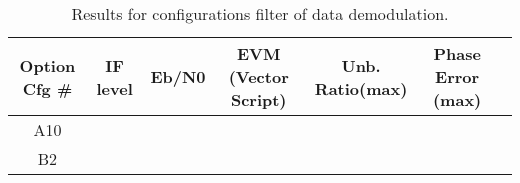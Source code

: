 \begin{table}[H]
	\centering
	\begin{tabular}{|c|c|c|c|c|c|c|}
	\hline	
	Option Cfg \# & IF level & Eb/N0 & EVM (Vector Script) & Unb. Ratio(max) & Phase Error (max) \\\hline
	A10 &  & & & & \\\hline
	B2 &  & & & & \\\hline
	\end{tabular}
	\caption{Results for configurations filter of data demodulation.}
	\label{tab:tm-filter}
\end{table}
